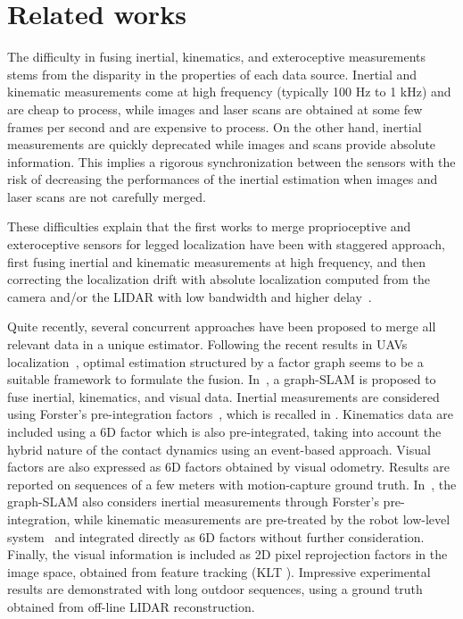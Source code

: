 \section{Related works}

The difficulty in fusing inertial, kinematics, and exteroceptive measurements stems from the disparity in the properties of each data source.
Inertial and kinematic measurements come at high frequency (typically 100 Hz to 1 kHz) and are cheap to process, while images and laser scans 
are obtained at some few frames per second and are expensive to process. 
On the other hand, inertial measurements are quickly deprecated while images and scans provide absolute information.
This implies a rigorous synchronization between the sensors with the risk of decreasing the performances of the inertial 
estimation when images and laser scans are not carefully merged. 

These difficulties explain that the first works to merge proprioceptive and exteroceptive sensors for legged localization 
have been with staggered approach, first fusing inertial and kinematic measurements at high frequency, and then correcting 
the localization drift with absolute localization computed from the camera and/or the LIDAR with low bandwidth and higher 
delay~\cite{nobili2017heterogeneous,fallon2014drift}.

Quite recently, several concurrent approaches have been proposed to merge all relevant data in a unique estimator.
Following the recent results in UAVs localization~\cite{forster2017-TRO,leutenegger2015keyframe}, optimal estimation 
structured by a factor graph seems to be a suitable framework to formulate the fusion.
In~\cite{hartley2018legged}, a graph-SLAM is proposed to fuse inertial, kinematics, and visual data.
Inertial measurements are considered using Forster's pre-integration factors~\cite{forster2017-TRO}, which is recalled in .
Kinematics data are included using a 6D factor which is also pre-integrated, taking into account the hybrid nature 
of the contact dynamics using an event-based approach.
Visual factors are also expressed as 6D factors obtained by visual odometry. Results are reported on sequences of a few meters with motion-capture ground truth.
In~\cite{wisth2019robust}, the graph-SLAM also considers inertial measurements through Forster's pre-integration, while kinematic
 measurements are pre-treated by the robot low-level system~\cite{bloesch2017two} and integrated directly as 6D factors without further consideration.
Finally, the visual information is included as 2D pixel reprojection factors in the image space, obtained from feature tracking (KLT \cite{baker2004lucas}).
Impressive experimental results are demonstrated with long outdoor sequences, using a ground truth obtained from off-line LIDAR reconstruction.

